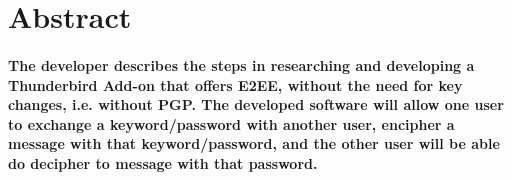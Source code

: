 \newpage
\section{Abstract}

\paragraph{The developer describes the steps in researching and developing a Thunderbird Add-on that offers E2EE, without the need for key changes, i.e. without PGP. The developed software will allow one user to exchange a keyword/password with another user, encipher a message with that keyword/password, and the other user will be able do decipher to message with that password.}